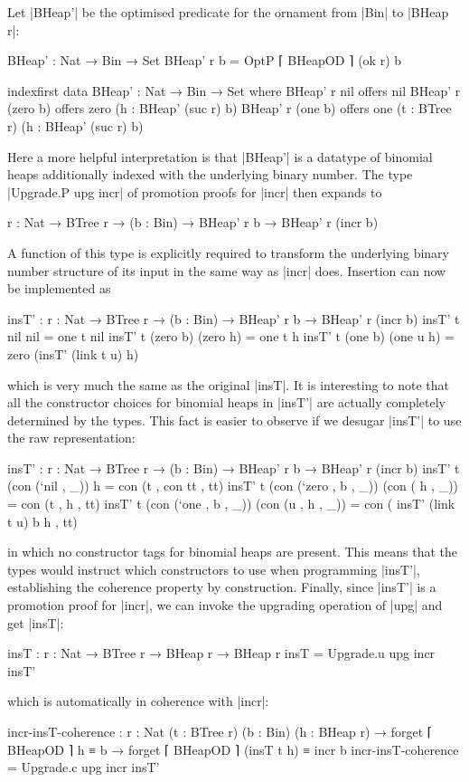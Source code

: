 Let |BHeap'| be the optimised predicate for the ornament from |Bin| to |BHeap r|:
\begin{code}
BHeap' : Nat → Bin → Set
BHeap' r b = OptP ⌈ BHeapOD ⌉ (ok r) b

indexfirst data BHeap' : Nat → Bin → Set where
  BHeap' r nil        offers  nil
  BHeap' r (zero  b)  offers  zero  (h : BHeap' (suc r) b)
  BHeap' r (one   b)  offers  one   (t : BTree r) (h : BHeap' (suc r) b)
\end{code}
Here a more helpful interpretation is that |BHeap'| is a datatype of binomial heaps additionally indexed with the underlying binary number.
The type |Upgrade.P upg incr| of promotion proofs for |incr| then expands to
\begin{code}
{r : Nat} → BTree r → (b : Bin) → BHeap' r b → BHeap' r (incr b)
\end{code}
A function of this type is explicitly required to transform the underlying binary number structure of its input in the same way as |incr| does.
Insertion can now be implemented as
\begin{code}
insT' : {r : Nat} → BTree r → (b : Bin) → BHeap' r b → BHeap' r (incr b)
insT' t nil        nil         = one t nil
insT' t (zero  b)  (zero   h)  = one t h
insT' t (one   b)  (one u  h)  = zero (insT' (link t u) h)
\end{code}
which is very much the same as the original |insT|.
It is interesting to note that all the constructor choices for binomial heaps in |insT'| are actually completely determined by the types.
This fact is easier to observe if we desugar |insT'| to use the raw representation:
\begin{code}
insT' : {r : Nat} → BTree r → (b : Bin) → BHeap' r b → BHeap' r (incr b)
insT' t (con (`nil   ,      _))  h                   = con (t ,  con tt                , tt)
insT' t (con (`zero  , b ,  _))  (con (     h , _))  = con (t ,  h                     , tt)
insT' t (con (`one   , b ,  _))  (con (u ,  h , _))  = con (     insT' (link t u) b h  , tt)
\end{code}
in which no constructor tags for binomial heaps are present.
This means that the types would instruct which constructors to use when programming |insT'|, establishing the coherence property by construction.
Finally, since |insT'| is a promotion proof for |incr|, we can invoke the upgrading operation of |upg| and get |insT|:
\begin{code}
insT : {r : Nat} → BTree r → BHeap r → BHeap r
insT = Upgrade.u upg incr insT'
\end{code}
which is automatically in coherence with |incr|:
\begin{code}
incr-insT-coherence :
  {r : Nat} (t : BTree r) (b : Bin) (h : BHeap r) →
  forget ⌈ BHeapOD ⌉ h ≡ b → forget ⌈ BHeapOD ⌉ (insT t h) ≡ incr b
incr-insT-coherence = Upgrade.c upg incr insT'
\end{code}

